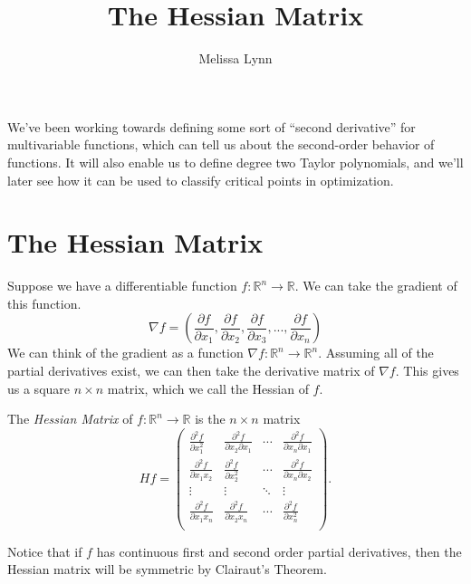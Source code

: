 \documentclass{ximera}
\title{The Hessian Matrix}
\author{Melissa Lynn}
\begin{document}
\begin{abstract}
\end{abstract}
\maketitle

We've been working towards defining some sort of ``second derivative'' for multivariable functions, which can tell us about the second-order behavior of functions. It will also enable us to define degree two Taylor polynomials, and we'll later see how it can be used to classify critical points in optimization. 

\section*{The Hessian Matrix}

Suppose we have a differentiable function $f:\mathbb{R}^n\rightarrow\mathbb{R}$. We can take the gradient of this function.
\[
\nabla f = \left(\frac{\partial f}{\partial x_1}, \frac{\partial f}{\partial x_2}, \frac{\partial f}{\partial x_3},..., \frac{\partial f}{\partial x_n} \right)
\]
We can think of the gradient as a function $\nabla f: \mathbb{R}^n\rightarrow\mathbb{R}^n$. Assuming all of the partial derivatives exist, we can then take the derivative matrix of $\nabla f$. This gives us a square $n\times n$ matrix, which we call the Hessian of $f$.

\begin{definition}
The \emph{Hessian Matrix} of $f:\mathbb{R}^n\rightarrow \mathbb{R}$ is the $n\times n$ matrix
\[
Hf = \begin{pmatrix}
\frac{\partial ^2 f}{\partial x_1^2} & \frac{\partial ^2 f}{\partial x_2\partial x_1} & \cdots & \frac{\partial ^2 f}{\partial x_n\partial x_1}\\
\frac{\partial ^2 f}{\partial x_1x_2} & \frac{\partial ^2 f}{\partial x_2^2} & \cdots & \frac{\partial ^2 f}{\partial x_n\partial x_2}\\
\vdots & \vdots &\ddots & \vdots\\
\frac{\partial ^2 f}{\partial x_1x_n} & \frac{\partial ^2 f}{\partial x_2x_n} & \cdots & \frac{\partial ^2 f}{\partial x_n^2}\\
\end{pmatrix}.
\]
\end{definition}

Notice that if $f$ has continuous first and second order partial derivatives, then the Hessian matrix will be symmetric by Clairaut's Theorem.
\end{document}
